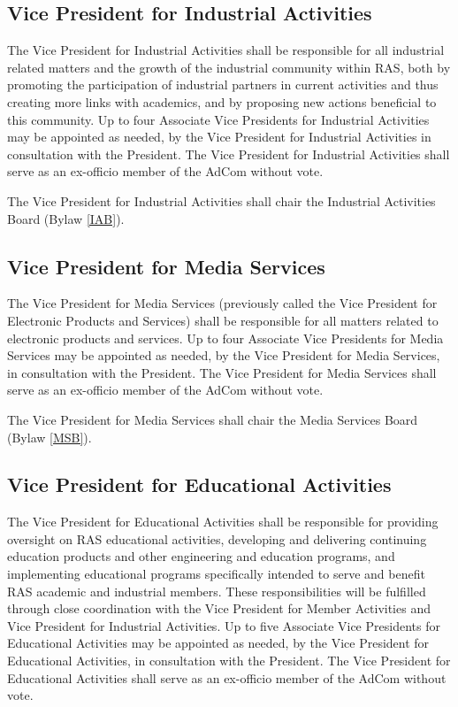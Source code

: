 \documentclass[10pt]{article}
\newcommand{\blref}[1]{Bylaw \ref{#1}}
\begin{document}
\subsection{Vice President for Industrial Activities}

The Vice President for Industrial Activities shall be responsible for all industrial related matters and the growth of the industrial community within RAS, both by promoting the participation of industrial partners in current activities and thus creating more links with academics, and by proposing new actions beneficial to this community. Up to four Associate Vice Presidents for Industrial Activities may be appointed as needed, by the Vice President for Industrial Activities in consultation with the President. The Vice President for Industrial Activities shall serve as an ex-officio member of the AdCom without vote.

The Vice President for Industrial Activities shall chair the Industrial Activities Board (\blref{IAB}). 



\subsection{Vice President for Media Services}

The Vice President for Media Services (previously called the Vice President for Electronic Products and Services) shall be responsible for all matters related to electronic products and services. Up to four Associate Vice Presidents for Media Services may be appointed as needed, by the Vice President for Media Services, in consultation with the President. The Vice President for Media Services shall serve as an ex-officio member of the AdCom without vote.

The Vice President for Media Services shall chair the Media Services Board (\blref{MSB}).

\subsection{Vice President for Educational Activities}

The Vice President for Educational Activities shall be responsible for providing oversight on RAS educational activities, developing and delivering continuing education products and other engineering and education programs, and implementing educational programs specifically intended to serve and benefit RAS academic and industrial members. These responsibilities will be fulfilled through close coordination with the Vice President for Member Activities and Vice President for Industrial Activities. 
Up to five Associate Vice Presidents for Educational Activities may be appointed as needed, by the Vice President for Educational Activities, in consultation with the President. The Vice President for Educational Activities shall serve as an ex-officio member of the AdCom without vote.
\end{document}
